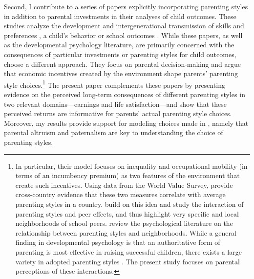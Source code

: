 \documentclass[12pt, a4paper, english]{article}
\begin{document}
Second, I contribute to a series of papers explicitly incorporating parenting styles in addition to parental investments in their analyses of child outcomes. These studies analyze the development \citep{FioriniKeane2014,Cunha2015,DelBonoetal2016,Ermisch2008,Cobb-Clark2018} and intergenerational transmission of skills and preferences \citep{Zumbuehletal2018,Deckersetal2017Balu,BrenoeEpper2019,Kiesslingetal2021PP}, a child's behavior \citep{DooleyStewart2007} or school outcomes \citep{Cosconati2012}. While these papers, as well as the developmental psychology literature, are primarily concerned with the consequences of particular investments or parenting styles for child outcomes, \citet{DoepkeZilibotti2017} choose a different approach. They focus on parental decision-making and argue that economic incentives created by the environment shape parents' parenting style choices.\footnote{In particular, their model focuses on inequality and occupational mobility (in terms of an incumbency premium) as two features of the environment that create such incentives. Using data from the World Value Survey, \citet{DoepkeZilibotti2017} provide cross-country evidence that these two measures correlate with average parenting styles in a country. \citet{Agostinellietal2020} build on this idea and study the interaction of parenting styles and peer effects, and thus highlight very specific and local neighborhoods of school peers. \citet{Cuellaretal2015} review the psychological literature on the relationship between parenting styles and neighborhoods. While a general finding in developmental psychology is that an authoritative form of parenting is most effective in raising successful children, there exists a large variety in adopted parenting styles \citep[e.g.,][]{Dornbuschetal1987,Lambornetal1991,Steinbergetal1991,ChanKoo2011}. The present study focuses on parental perceptions of these interactions.} The present paper complements these papers by presenting evidence on the perceived long-term consequences of different parenting styles in two relevant domains---earnings and life satisfaction---and show that these perceived returns are informative for parents' actual parenting style choices. Moreover, my results provide support for modeling choices made in \citet{DoepkeZilibotti2017}, namely that parental altruism and paternalism are key to understanding the choice of parenting styles.
\end{document}
